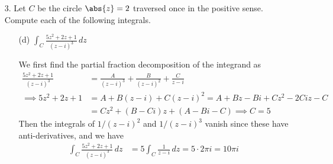\documentclass{article}
\begin{document}
\begin{itemize}
	\item[3.] Let $C$ be the circle $\abs{z}=2$ traversed once in the positive sense. Compute each of the following integrals.
		\begin{itemize}
			\item[(d)] $\int_C \frac{5z^2+2z+1}{(z-i)^3}\, dz$
				\begin{soln}
					We first find the partial fraction decomposition of the integrand as
					\begin{align*}
						\frac{5z^2+2z+1}{(z-i)^3} &= \frac{A}{(z-i)^3} + \frac{B}{(z-i)^2} + \frac{C}{z-i} \\
						\implies 5z^2+2z+1 &= A + B(z-i) + C(z-i)^2 = A + Bz - Bi + Cz^2-2Ciz -C \\
						&= Cz^2 + (B - Ci)z + (A-Bi-C) \implies C = 5
					\end{align*}
					Then the integrals of $1/(z-i)^2$ and $1/(z-i)^3$ vanish since these have anti-derivatives, and we have 
					\begin{align*}
						\int_C \frac{5z^2+2z+1}{(z-i)^3}\, dz &= 5\int_C \frac{1}{z-i}\, dz = 5\cdot 2\pi i= 10\pi i
					\end{align*}
				\end{soln}
				
		\end{itemize}


\end{itemize}
\end{document}
